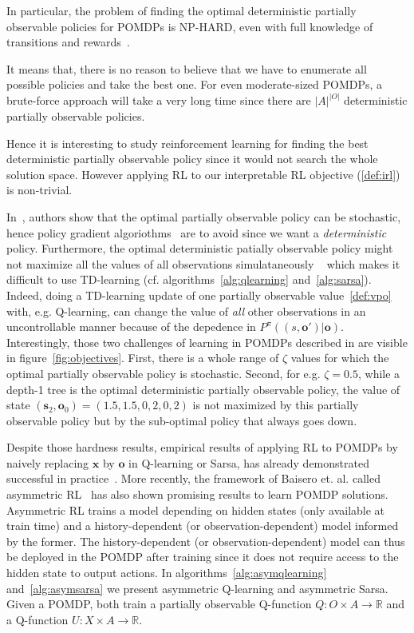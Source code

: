 In particular, the problem of finding the optimal deterministic partially observable policies for POMDPs is NP-HARD, even with full knowledge of transitions and rewards~\cite[section 3.2]{littman1}. 

It means that, there is no reason to believe that we have to enumerate all possible policies and take the best one. 
For even moderate-sized POMDPs, a brute-force approach will take a very long time since there are $|A|^{|O|}$ deterministic partially observable policies.

Hence it is interesting to study reinforcement learning for finding the best deterministic partially observable policy since it would not search the whole solution space.
However applying RL to our interpretable RL objective (\ref{def:irl}) is non-trivial.

In~\cite[Fact 2]{learning-pomdp}, authors show that the optimal partially observable policy can be stochastic, hence policy gradient algoriothms~\cite{pg_sutton} are to avoid since we want a \textit{deterministic} policy. 
Furthermore, the optimal deterministic patially observable policy might not maximize all the values of all observations simulataneously ~\cite[Fact 5]{learning-pomdp} which makes it difficult to use TD-learning (cf. algorithms~\ref{alg:qlearning} and~\ref{alg:sarsa}).
Indeed, doing a TD-learning update of one partially observable value~\ref{def:vpo} with, e.g. Q-learning, can change the value of \textit{all} other observations in an uncontrollable manner because of the depedence in $P^{\pi}((s, \boldsymbol{o}')|\boldsymbol{o})$.
Interestingly, those two challenges of learning in POMDPs described in \cite{learning-pomdp} are visible in figure~\ref{fig:objectives}. 
First, there is a whole range of $\zeta$ values for which the optimal partially observable policy is stochastic.
Second, for e.g. $\zeta=0.5$, while a depth-1 tree is the optimal deterministic partially observable policy, the value of state $(\boldsymbol{s}_2, \boldsymbol{o}_0) = (1.5, 1.5, 0, 2, 0, 2)$ is not maximized by this partially observable policy but by the sub-optimal policy that always goes down.

Despite those hardness results, empirical results of applying RL to POMDPs by naively replacing $\boldsymbol{x}$ by $\boldsymbol{o}$ in Q-learning or Sarsa, has already demonstrated successful in practice~\cite{sarsa-pomdp}. 
More recently, the framework of Baisero et. al. called asymmetric RL~\cite{baisero-dqn,baisero-ppo} has also shown promising results to learn POMDP solutions.
Asymmetric RL trains a model depending on hidden states (only available at train time) and a history-dependent (or observation-dependent) model informed by the former.
The history-dependent (or observation-dependent) model can thus be deployed in the POMDP after training since it does not require access to the hidden state to output actions.
In algorithms~\ref{alg:asymqlearning} and~\ref{alg:asymsarsa} we present asymmetric Q-learning and asymmetric Sarsa. Given a POMDP, both train a partially observable Q-function $Q:O\times A\rightarrow\mathbb{R}$ and a Q-function $U:X\times A\rightarrow\mathbb{R}$.

